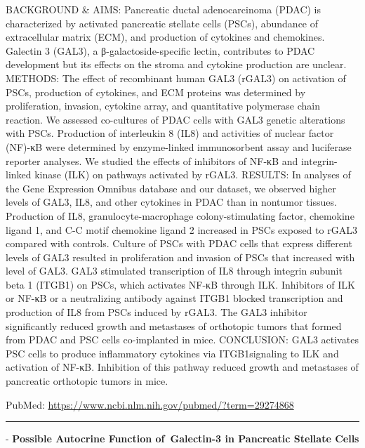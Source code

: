 \documentclass[]{article}
\begin{document}
BACKGROUND \& AIMS: Pancreatic ductal adenocarcinoma (PDAC) is
characterized by activated pancreatic stellate cells (PSCs), abundance
of extracellular matrix (ECM), and production of cytokines and
chemokines. Galectin 3 (GAL3), a β-galactoside-specific lectin,
contributes to PDAC development but its effects on the stroma and
cytokine production are unclear. METHODS: The effect of recombinant
human GAL3 (rGAL3) on activation of PSCs, production of cytokines, and
ECM proteins was determined by proliferation, invasion, cytokine array,
and quantitative polymerase chain reaction. We assessed co-cultures of
PDAC cells with GAL3 genetic alterations with PSCs. Production of
interleukin 8 (IL8) and activities of nuclear factor (NF)-κB were
determined by enzyme-linked immunosorbent assay and luciferase reporter
analyses. We studied the effects of inhibitors of NF-κB and
integrin-linked kinase (ILK) on pathways activated by rGAL3. RESULTS: In
analyses of the Gene Expression Omnibus database and our dataset, we
observed higher levels of GAL3, IL8, and other cytokines in PDAC than in
nontumor tissues. Production of IL8, granulocyte-macrophage
colony-stimulating factor, chemokine ligand 1, and C-C motif chemokine
ligand 2 increased in PSCs exposed to rGAL3 compared with controls.
Culture of PSCs with PDAC cells that express different levels of GAL3
resulted in proliferation and invasion of PSCs that increased with level
of GAL3. GAL3 stimulated transcription of IL8 through integrin subunit
beta 1 (ITGB1) on PSCs, which activates NF-κB through ILK. Inhibitors of
ILK or NF-κB or a neutralizing antibody against ITGB1 blocked
transcription and production of IL8 from PSCs induced by rGAL3. The GAL3
inhibitor significantly reduced growth and metastases of orthotopic
tumors that formed from PDAC and PSC cells co-implanted in mice.
CONCLUSION: GAL3 activates PSC cells to produce inflammatory cytokines
via ITGB1signaling to ILK and activation of NF-κB. Inhibition of this
pathway reduced growth and metastases of pancreatic orthotopic tumors in
mice.

PubMed: \url{https://www.ncbi.nlm.nih.gov/pubmed/?term=29274868}

{}

{}

\begin{center}\rule{0.5\linewidth}{\linethickness}\end{center}

 - \textbf{Possible Autocrine Function of~Galectin-3 in Pancreatic
Stellate Cells}
\end{document}
